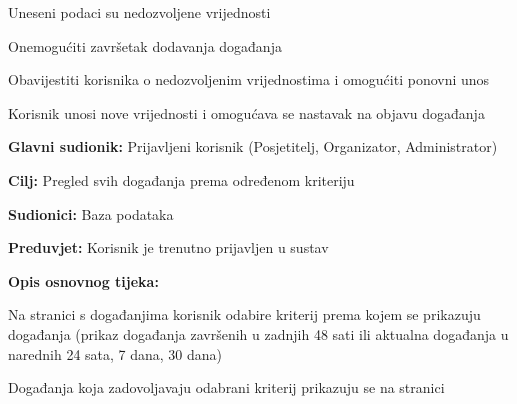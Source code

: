\begin{packed_item}
\begin{packed_item}
								\item[2.a] Uneseni podaci su nedozvoljene vrijednosti
								\item[] \begin{packed_enum}
									
									\item Onemogućiti završetak dodavanja događanja
									\item Obavijestiti korisnika o nedozvoljenim vrijednostima i omogućiti ponovni unos 
									\item Korisnik unosi nove vrijednosti i omogućava se nastavak na objavu događanja
									
								\end{packed_enum}		
							\end{packed_item}
							
					\end{packed_item}
					

					\noindent {}
					\begin{packed_item}
						
						\item \textbf{Glavni sudionik:} Prijavljeni korisnik (Posjetitelj, Organizator, Administrator)
						\item  \textbf{Cilj:} Pregled svih događanja prema određenom kriteriju
						\item  \textbf{Sudionici:} Baza podataka
						\item  \textbf{Preduvjet:} Korisnik je trenutno prijavljen u sustav 
						\item  \textbf{Opis osnovnog tijeka:}
						
						\item[] \begin{packed_enum}
							
							\item Na stranici s događanjima korisnik odabire kriterij prema kojem se prikazuju događanja (prikaz događanja završenih u zadnjih 48 sati ili aktualna događanja u narednih 24 sata, 7 dana, 30 dana)
							\item Događanja koja zadovoljavaju odabrani kriterij prikazuju se na stranici
						
						\end{packed_enum}
						
					\end{packed_item}
					
